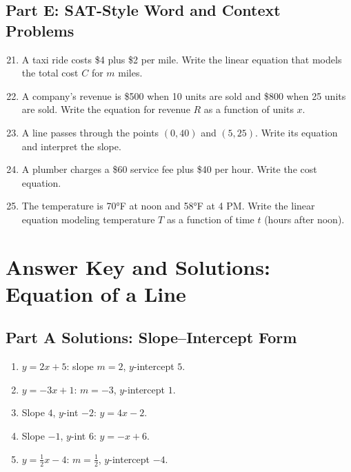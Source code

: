 \documentclass[14pt]{extarticle}
\begin{document}
\subsection*{Part E: SAT-Style Word and Context Problems}
\begin{enumerate}
    \setcounter{enumi}{20}
    \item A taxi ride costs \$4 plus \$2 per mile. Write the linear equation that models the total cost \(C\) for \(m\) miles.
    \item A company’s revenue is \$500 when 10 units are sold and \$800 when 25 units are sold. Write the equation for revenue \(R\) as a function of units \(x\).
    \item A line passes through the points \((0, 40)\) and \((5, 25)\). Write its equation and interpret the slope.
    \item A plumber charges a \$60 service fee plus \$40 per hour. Write the cost equation.
    \item The temperature is 70°F at noon and 58°F at 4 PM. Write the linear equation modeling temperature \(T\) as a function of time \(t\) (hours after noon).
\end{enumerate}

\newpage


\section*{Answer Key and Solutions: Equation of a Line}

\subsection*{Part A Solutions: Slope–Intercept Form}
\begin{enumerate}
    \item \(y=2x+5\): slope \(m=\boxed{2}\), \(y\)-intercept \(\boxed{5}\).
    \item \(y=-3x+1\): \(m=\boxed{-3}\), \(y\)-intercept \(\boxed{1}\).
    \item Slope \(4\), \(y\)-int \(-2\): \(\boxed{y=4x-2}\).
    \item Slope \(-1\), \(y\)-int \(6\): \(\boxed{y=-x+6}\).
    \item \(y=\tfrac12 x-4\): \(m=\boxed{\tfrac12}\), \(y\)-intercept \(\boxed{-4}\).
\end{enumerate}
\end{document}
